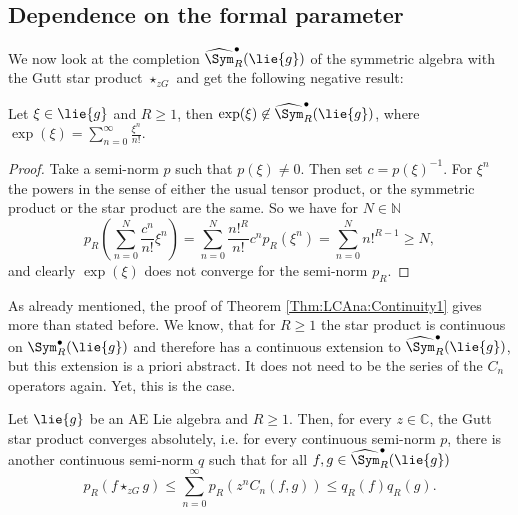 \subsection{Dependence on the formal parameter}

We now look at the completion $\widehat{\Sym}_R^{\bullet}(\lie{g})$ of
the symmetric algebra with the Gutt star product $\star_{zG}$ and 
get the following negative result:
\begin{proposition}
    \label{proposition:NoExponentialsSorry}%
    Let $\xi \in \lie{g}$ and $R \geq 1$, then $\exp(\xi) \not\in
    \widehat{\Sym}_R^{\bullet}(\lie{g})$, where $\exp(\xi) =
    \sum_{n=0}^{\infty} \frac{\xi^n}{n!}$.
\end{proposition}
\begin{proof}
    Take a semi-norm $p$ such that $p(\xi) \neq 0$. Then set $c =
    p(\xi)^{-1}$. For $\xi^n$ the powers in the sense of either the
    usual tensor product, or the symmetric product or the star product
    are the same. So we have for $N \in \mathbb{N}$
    \begin{equation*}
        p_R \left(
        \sum\limits_{n=0}^N
        \frac{c^n}{n!} \xi^n
        \right)
        =
        \sum\limits_{n=0}^N
        \frac{n!^R}{n!}
        c^n
        p_R \left( \xi^n
        \right)
        =
        \sum\limits_{n=0}^N
        n!^{R - 1}
        \geq
        N,
    \end{equation*}
    and clearly $\exp(\xi)$ does not converge for the semi-norm $p_R$.
\end{proof}
As already mentioned, the proof of Theorem \ref{Thm:LCAna:Continuity1}
gives more than stated before. We know, that for $R \geq 1$ the star product 
is continuous on $\Sym_R^{\bullet}(\lie{g})$ and therefore has a continuous 
extension to $\widehat{\Sym}_R^{\bullet}(\lie{g})$, but this extension is a 
priori abstract. It does not need to be the series of the $C_n$ operators 
again. Yet, this is the case.
\begin{corollary}
	\label{Coro:LCAna:StarProdAbsConv}
	Let $\lie{g}$ be an AE Lie algebra and $R \geq 1$. Then, for every $z \in 
	\mathbb{C}$, the Gutt star product converges absolutely, i.e. for every 
	continuous semi-norm $p$, there is another continuous semi-norm $q$ such 
	that for all $f,g \in \widehat{\Sym}_R^{\bullet}(\lie{g})$
	\begin{equation}
		\label{LCAna:StarProdAbsConv}
		p_R \left( f \star_{zG} g \right)
		\leq
		\sum\limits_{n = 0}^{\infty}
		p_R \left( z^n C_n(f, g) \right)
		\leq
		q_R(f) q_R(g).
	\end{equation}
\end{corollary}
